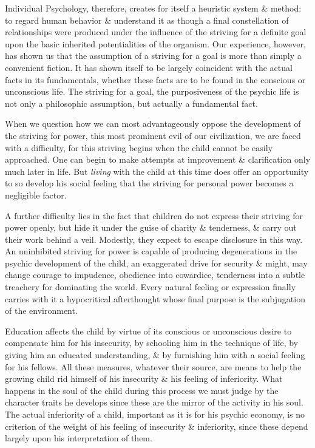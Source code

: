 \documentclass{article}
\begin{document}
Individual Psychology, therefore, creates for itself a heuristic system \& method: to regard human behavior \& understand it as though a final constellation of relationships were produced under the influence of the striving for a definite goal upon the basic inherited potentialities of the organism. Our experience, however, has shown us that the assumption of a striving for a goal is more than simply a convenient fiction. It has shown itself to be largely coincident with the actual facts in its fundamentals, whether these facts are to be found in the conscious or unconscious life. The striving for a goal, the purposiveness of the psychic life is not only a philosophic assumption, but actually a fundamental fact.

When we question how we can most advantageously oppose the development of the striving for power, this most prominent evil of our civilization, we are faced with a difficulty, for this striving begins when the child cannot be easily approached. One can begin to make attempts at improvement \& clarification only much later in life. But {\it living} with the child at this time does offer an opportunity to so develop his social feeling that the striving for personal power becomes a negligible factor.

A further difficulty lies in the fact that children do not express their striving for power openly, but hide it under the guise of charity \& tenderness, \& carry out their work behind a veil. Modestly, they expect to escape disclosure in this way. An uninhibited striving for power is capable of producing degenerations in the psychic development of the child, an exaggerated drive for security \& might, may change courage to impudence, obedience into cowardice, tenderness into a subtle treachery for dominating the world. Every natural feeling or expression finally carries with it a hypocritical afterthought whose final purpose is the subjugation of the environment.

Education affects the child by virtue of its conscious or unconscious desire to compensate him for his insecurity, by schooling him in the technique of life, by giving him an educated understanding, \& by furnishing him with a social feeling for his fellows. All these measures, whatever their source, are means to help the growing child rid himself of his insecurity \& his feeling of inferiority. What happens in the soul of the child during this process we must judge by the character traits he develops since these are the mirror of the activity in his soul. The actual inferiority of a child, important as it is for his psychic economy, is no criterion of the weight of his feeling of insecurity \& inferiority, since these depend largely upon his interpretation of them.
\end{document}
